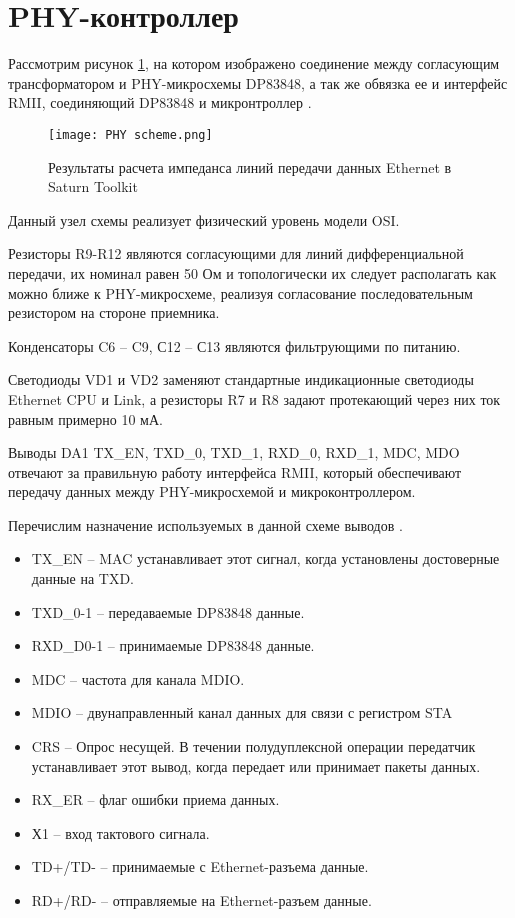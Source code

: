 \section{PHY-контроллер}
\hspace{1cm} 


Рассмотрим рисунок \ref{ris:PhyScheme}, на котором изображено соединение между согласующим трансформатором 
и PHY-микросхемы DP83848, а так же обвязка ее и интерфейс RMII, соединяющий DP83848 и микронтроллер 
\cite{DP83848:datasheet}. 

\begin{figure}[H]
\centering
\texttt{[image: PHY scheme.png]}
\caption{Результаты расчета импеданса линий передачи данных Ethernet в Saturn Toolkit}
\label{ris:PhyScheme}
\end{figure}

Данный узел схемы реализует физический уровень модели OSI. 

Резисторы R9-R12 являются согласующими для линий дифференциальной передачи, их номинал равен 50 Ом и топологически 
их следует располагать как можно ближе к PHY-микросхеме, реализуя согласование последовательным резистором на 
стороне приемника. 

Конденсаторы C6 -- C9, С12 -- С13 являются фильтрующими по питанию. 

Светодиоды VD1 и VD2 заменяют стандартные индикационные светодиоды Ethernet CPU и Link, а резисторы 
R7 и R8 задают протекающий через них ток равным примерно 10 мА.  

Выводы DA1 TX\_EN, TXD\_0, TXD\_1, RXD\_0, RXD\_1, MDC, MDO отвечают за правильную работу интерфейса
RMII, который обеспечивают передачу данных между PHY-микросхемой и микроконтроллером. 

Перечислим назначение используемых в данной схеме выводов \cite{DP83848:datasheet}.
\begin{itemize}
    \item TX\_EN -- MAC устанавливает этот сигнал, когда установлены достоверные данные на TXD.
    \item TXD\_0-1 -- передаваемые DP83848 данные.
    \item RXD\_D0-1 -- принимаемые DP83848 данные.
    \item MDC -- частота для канала MDIO.
    \item MDIO -- двунаправленный канал данных для связи с регистром STA
    \item CRS -- Опрос несущей. В течении полудуплексной операции передатчик устанавливает этот 
    вывод, когда передает или принимает пакеты данных. 
    \item RX\_ER -- флаг ошибки приема данных. 
    \item Х1 -- вход тактового сигнала.
    \item TD+/TD- -- принимаемые с Ethernet-разъема данные.
    \item RD+/RD- -- отправляемые на Ethernet-разъем данные.
\end{itemize}
 